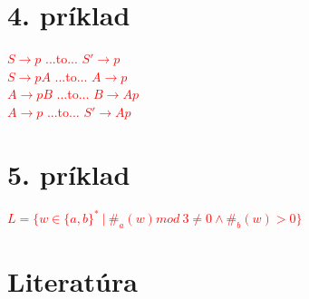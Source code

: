 \documentclass[11pt,a4paper]{article}
\newcommand{\red}[1]{\textcolor{red}{#1}}
\begin{document}
\section{4. príklad}
\red{
$S \rightarrow p$  ...to... $S' \rightarrow p$\\
$S \rightarrow pA$ ...to... $A \rightarrow p$\\
$A \rightarrow pB$ ...to... $B \rightarrow Ap$\\
$A \rightarrow p$  ...to... $S' \rightarrow Ap$\\
}

\section{5. príklad}
\red{$L = \{ w \in \{a,b\}^*\ |\ \#_a(w)mod\ 3 \neq 0 \wedge \#_b(w) > 0\}$}
\newpage

\section{Literatúra}

\begin{flushleft}
    
\end{flushleft}
\end{document}
